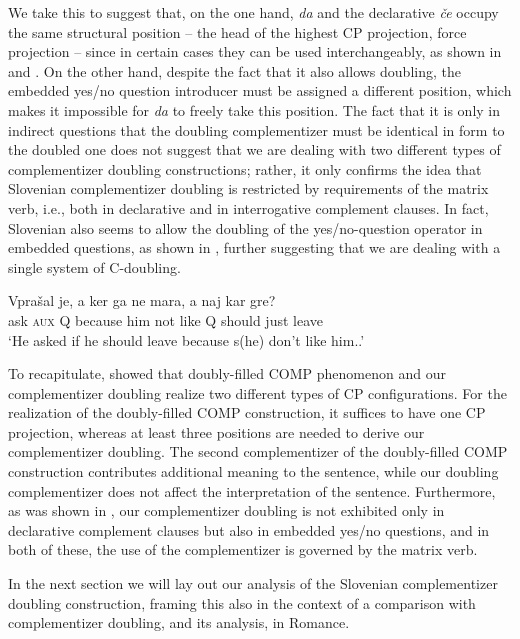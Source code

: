 \documentclass[output=paper,
]{langscibook}
\begin{document}
\noindent We take this to suggest that, on the one hand, \textit{da} and the declarative \textit{če} occupy the same structural position -- the head of the highest CP projection, force projection -- since in certain cases they can be used interchangeably, as shown in  and . On the other hand, despite the fact that it also allows doubling, the embedded yes/no question introducer must be assigned a different position, which makes it impossible for \textit{da} to freely take this position. The fact that it is only in indirect questions that the doubling complementizer must be identical in form to the doubled one does not suggest that we are dealing with two different types of complementizer doubling constructions; rather, it only confirms the idea that Slovenian complementizer doubling is restricted by requirements of the matrix verb, i.e., both in declarative and in interrogative complement clauses. In fact, Slovenian also seems to allow the doubling of the yes/no-question operator in embedded questions, as shown in , further suggesting that we are dealing with a single system of C-doubling.

\begin{exe} 
\ex \label{ex:plesnicar:thirtyfour}
\gll Vprašal je, a 	ker ga 	ne 	mara, 	a 	naj 	kar 	gre?\\
   ask \textsc{aux} Q because him	not	like Q	should	just	leave\\
\trans `He asked if he should leave because s(he) don’t like him..'
\end{exe}

\noindent To recapitulate,  showed that  doubly-filled COMP phenomenon and our complementizer doubling realize two different types of CP configurations. For the realization of the doubly-filled COMP construction, it suffices to have one CP projection, whereas at least three positions are needed to derive our complementizer doubling. The second complementizer of the doubly-filled COMP construction contributes additional meaning to the sentence, while our doubling complementizer does not affect the interpretation of the sentence. Furthermore, as was shown in , our complementizer doubling is not exhibited only in declarative complement clauses but also in embedded yes/no questions, and in both of these, the use of the complementizer is governed by the matrix verb.

In the next section we will lay out our analysis of the Slovenian complementizer doubling construction, framing this also in the context of a comparison with complementizer doubling, and its analysis, in Romance. 
\end{document}
